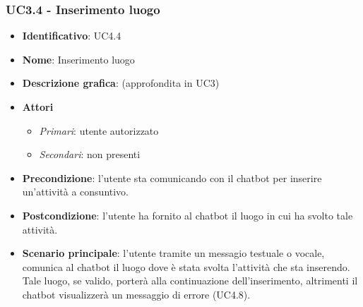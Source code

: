 \subsubsection{UC3.4 - Inserimento luogo }
\begin{itemize}
    \item \textbf{Identificativo}: UC4.4
    \item \textbf{Nome}: Inserimento luogo   
    \item \textbf{Descrizione grafica}: (approfondita in UC3)
    \item \textbf{Attori}
        \begin{itemize} 
            \item \textit{Primari}: utente autorizzato
            \item \textit{Secondari}: non presenti
        \end{itemize}
    \item \textbf{Precondizione}: l'utente sta comunicando con il chatbot per inserire un'attività a consuntivo. 
    \item \textbf{Postcondizione}: l'utente ha fornito al chatbot il luogo in cui ha svolto tale attività. 
    \item \textbf{Scenario principale}: l'utente tramite un messagio testuale o vocale, comunica al chatbot il luogo dove è stata svolta l'attività che sta inserendo. Tale luogo, se valido, porterà alla continuazione dell'inserimento, altrimenti il chatbot visualizzerà un messaggio di errore (UC4.8). 
\end{itemize}

